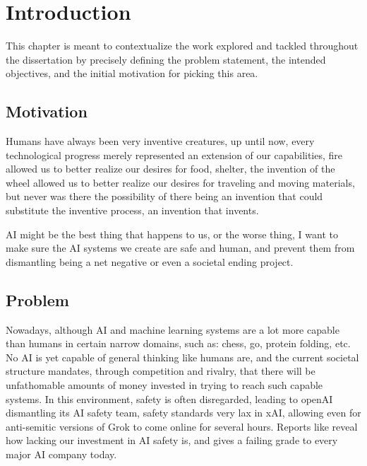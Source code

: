 \chapter{Introduction}\label{chap:introduction}

This chapter is meant to contextualize the work explored and tackled throughout the dissertation by precisely defining the problem statement, the intended objectives, and the initial motivation for picking this area.

\section{Motivation}

Humans have always been very inventive creatures, up until now, every technological progress merely represented an extension of our capabilities, fire allowed us to better realize our desires for food, shelter, the invention of the wheel allowed us to better realize our desires for traveling and moving materials, but never was there the possibility of there being an invention that could substitute the inventive process, an invention that invents. 

AI might be the best thing that happens to us, or the worse thing, I want to make sure the AI systems we create are safe and human, and prevent them from dismantling being a net negative or even a societal ending project.


\section{Problem}

Nowadays, although AI and machine learning systems are a lot more capable than humans in certain narrow domains, such as: chess, go, protein folding, etc. No AI is yet capable of general thinking like humans are, and the current societal structure mandates, through competition and rivalry, that there will be unfathomable amounts of money invested in trying to reach such capable systems. In this environment, safety is often disregarded, leading to openAI dismantling its AI safety team, safety standards very lax in xAI, allowing even for anti-semitic versions of Grok to come online for several hours. Reports like \cite{IAISafetyReport2025} reveal how lacking our investment in AI safety is, and \cite{FLIAISafetyIndex2025} gives a failing grade to every major AI company today. 

